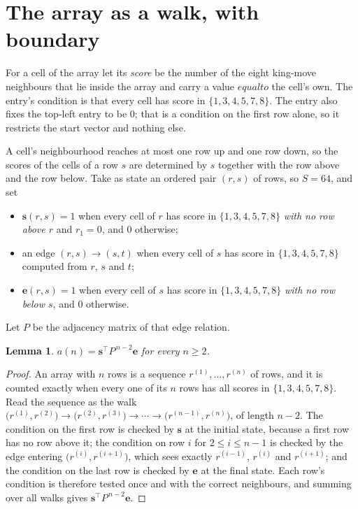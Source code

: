 \documentclass[11pt,a4paper]{article}
\theoremstyle{plain}
\newtheorem{lemma}[theorem]{Lemma}
\theoremstyle{definition}
\begin{document}
\section{The array as a walk, with boundary}

For a cell of the array let its \emph{score} be the number of the eight king-move neighbours that lie inside
the array and carry a value $equal to$ the cell's own. The entry's condition is that every cell
has score in $\{1,3,4,5,7,8\}$. The entry also fixes the top-left entry to be $0$; that is a condition on the first row alone, so it restricts the start vector and nothing else.

A cell's neighbourhood reaches at most one row up and one row down, so the scores of the
cells of a row $s$ are determined by $s$ together with the row above and the row below.
Take as state an ordered pair $(r,s)$ of rows, so $S=64$, and set
\begin{itemize}
\item $\mathbf{s}(r,s)=1$ when every cell of $r$ has score in $\{1,3,4,5,7,8\}$ \emph{with no row
above $r$} and $r_1=0$, and $0$ otherwise;
\item an edge $(r,s)\to(s,t)$ when every cell of $s$ has score in $\{1,3,4,5,7,8\}$ computed from
$r$, $s$ and $t$;
\item $\mathbf{e}(r,s)=1$ when every cell of $s$ has score in $\{1,3,4,5,7,8\}$ \emph{with no row
below $s$}, and $0$ otherwise.
\end{itemize}
Let $P$ be the adjacency matrix of that edge relation.

\begin{lemma}\label{lem:walk}
$a(n)=\mathbf{s}^{\!\top}P^{\,n-2}\mathbf{e}$ for every $n\ge2$.
\end{lemma}

\begin{proof}
An array with $n$ rows is a sequence $r^{(1)},\dots,r^{(n)}$ of rows, and it is counted
exactly when every one of its $n$ rows has all scores in $\{1,3,4,5,7,8\}$. Read the sequence as the
walk $\bigl(r^{(1)},r^{(2)}\bigr)\to\bigl(r^{(2)},r^{(3)}\bigr)\to\cdots\to
\bigl(r^{(n-1)},r^{(n)}\bigr)$, of length $n-2$. The condition on the first row is
checked by $\mathbf{s}$ at the initial state, because a first row has no row above it; the
condition on row $i$ for $2\le i\le n-1$ is checked by the edge entering
$\bigl(r^{(i)},r^{(i+1)}\bigr)$, which sees exactly $r^{(i-1)}$, $r^{(i)}$ and
$r^{(i+1)}$; and the condition on the last row is checked by $\mathbf{e}$ at the final
state. Each row's condition is therefore tested once and with the correct neighbours, and
summing over all walks gives $\mathbf{s}^{\!\top}P^{\,n-2}\mathbf{e}$.
\end{proof}
\end{document}
